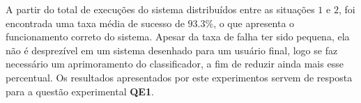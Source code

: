 \begin{table}[ht]
    \centering
    \caption{Dados coletados do experimento com um usuário experiente.}
    \label{tab:resultados}
\end{table}

A partir do total de 
execuções do sistema distribuídos entre as situações $1$ e $2$, foi encontrada uma taxa média de sucesso de $93.3$\%, o que apresenta 
o funcionamento correto do sistema.
Apesar da taxa de falha ter sido pequena, ela não é desprezível em um sistema desenhado para um usuário final, logo se faz necessário um aprimoramento do classificador, a fim de reduzir ainda mais esse percentual. Os resultados apresentados por este experimentos servem de resposta para a questão experimental \textbf{QE1}.






